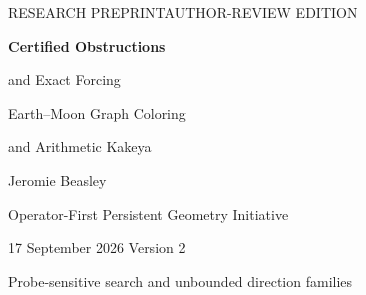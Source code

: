 \documentclass[11pt,letterpaper]{article}
\theoremstyle{definition}
\theoremstyle{remark}\newtheorem{remark}[theorem]{Remark}
\begin{document}
\begin{titlepage}
\vspace*{0.05in}
\begin{center}
{\small RESEARCH PREPRINT\quad\textbullet\quad AUTHOR-REVIEW EDITION}\par
\vspace{0.20in}
{\LARGE\bfseries Certified Obstructions\par and Exact Forcing}\par
\vspace{0.2in}
{\Large Earth--Moon Graph Coloring\par and Arithmetic Kakeya}\par
\vspace{0.24in}
{\large Jeromie Beasley}\par
\vspace{0.08in}
{Operator-First Persistent Geometry Initiative}\par
\vspace{0.12in}
{17 September 2026 \quad\textbullet\quad Version 2}\par
\vspace{0.10in}
{\small Probe-sensitive search and unbounded direction families}\par
\end{center}
\vspace{0.12in}
\begin{abstract}
We develop certificate-based approaches to the Earth--Moon and arithmetic Kakeya construction problems. For Earth--Moon, a triangle-free subgraph bound excludes inflated cycles $C_n[K_r]$ for $n,r\geq4$. Explicit decompositions prove $\theta(C_n[K_4])=3$, and an explicit coloring proves that every biplanar subgraph of $C_7[K_4]$ is nine-colorable. A separate nineteen-vertex reduction retains its archived $100$--$102$-edge endpoint restriction.

For arithmetic Kakeya, exact nonzero-multiple forcing is expressed through row spaces and integer primal--dual certificates. We derive a target-sensitive numerator-residue criterion and exact kernel updates, then classify the first possible escape produced by one variable site generator. On the fixed six-vertex Katz--Tao edge core, this reduces 5,166 unbounded integer-label families to 6,112 checked representatives: two generator placements come from a specified seven-direction pool, while the third direction is unrestricted. All are excluded by 25,498 integer target-dual identities. A separate 36-family exclusion covers one initially known site and one arbitrary generator.


\end{abstract}
\end{titlepage}
\end{document}
